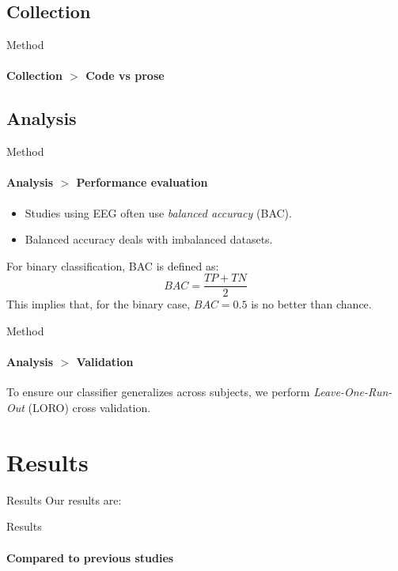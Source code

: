 \documentclass[xcolor={dvipsnames,table},12pt]{beamer}
\begin{document}
\subsection{Collection}
\begin{frame}{Method}
    \framesubtitle{Collection $>$ Code vs prose}
    {
        \small
        
    }
\end{frame}

\subsection{Analysis}
\begin{frame}{Method}
    \framesubtitle{Analysis $>$ Performance evaluation}
    \begin{itemize}
        \item Studies using EEG often use \emph{balanced accuracy} (BAC).
        \item Balanced accuracy deals with imbalanced datasets.
    \end{itemize}

    \vspace{2em}

    For binary classification, BAC is defined as:
    $$BAC = \frac{TP + TN}{2}$$
    This implies that, for the binary case, $BAC = 0.5$ is no better than chance.
\end{frame}

\begin{frame}{Method}
    \framesubtitle{Analysis $>$ Validation}
    To ensure our classifier generalizes across subjects, we perform \emph{Leave-One-Run-Out} (LORO) cross validation.
    \vspace{1em}
    
\end{frame}

\section{Results}
\begin{frame}{Results}
    Our results are:
    {
        \small
        
    }
\end{frame}

\begin{frame}{Results}
    \framesubtitle{Compared to previous studies}
    \
    {
        \small
        
    }
\end{frame}
\end{document}
